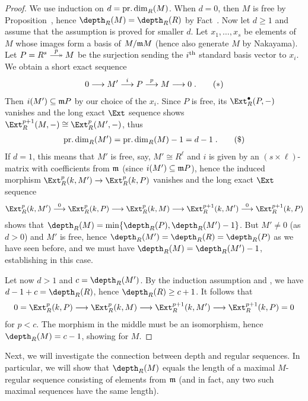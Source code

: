 \documentclass[a4paper,parskip=half,numbers=enddot, DIV=12]{scrreprt}
\begin{document}
\begin{proof}
	We use induction on $d=\operatorname{pr.dim}_R(M)$. When $d=0$, then $M$ is free by Proposition~, hence $\depth_R(M)=\depth_R(R)$ by Fact~. Now let $d\geq 1$ and assume that the assumption is proved for smaller $d$. Let $x_1,\ldots,x_s$ be elements of $M$ whose images form a basis of $M/\mathfrak{m} M$ (hence also generate $M$ by Nakayama). Let $P=R^s\epimorphism[p] M$ be the surjection sending the $i^{\text{th}}$ standard basis vector to $x_i$. We obtain a short exact sequence
	\begin{align}\lbl{eq:exactSeq1}
		0\morphism M'\morphism[i] P\morphism[p] M\morphism 0\;.\tag{$*$}
	\end{align}
	Then $i(M')\subseteq \mathfrak{m} P$ by our choice of the $x_i$. Since $P$ is free, its $\Ext_R^\bullet(P,-)$ vanishes and the long exact $\Ext$ sequence shows $\Ext_R^{p+1}(M,-)\cong \Ext_R^p(M',-)$, thus 
	\begin{align}\lbl{eq:depthInduction}
		\pdim_R(M')=\pdim_R(M)-1=d-1\;.\tag{\$}
	\end{align}
	If $d=1$, this means that $M'$ is free, say, $M'\cong R^\ell$ and $i$ is given by an $(s\times \ell)$-matrix with coefficients from $\mathfrak{m}$ (since $i(M')\subseteq \mathfrak{m} P$), hence the induced morphism $\Ext_R^p(k,M')\morphism\Ext_R^p(k,P)$ vanishes and the long exact $\Ext$ sequence
	\begin{align*}
		\Ext_R^p(k,M')\morphism[0]\Ext_R^p(k,P)\morphism\Ext_R^p(k,M)\morphism\Ext_R^{p+1}(k,M')\morphism[0]\Ext_R^{p+1}(k,P)
	\end{align*}
	shows that $\depth_R(M)=\min\{\depth_R(P),\depth_R(M')-1\}$. But $M'\neq 0$ (as $d>0$) and $M'$ is free, hence $\depth_R(M')=\depth_R(R)=\depth_R(P)$ as we have seen before, and we must have $\depth_R(M)=\depth_R(M')-1$, establishing  in this case.
	
	Let now $d>1$ and $c=\depth_R(M')$. By the induction assumption and , we have $d-1+c=\depth_R(R)$, hence $\depth_R(R)\geq c+1$. It follows that
	\begin{align*}
		0=\Ext_R^p(k,P)\morphism\Ext_R^p(k,M)\morphism\Ext_R^{p+1}(k,M')\morphism\Ext_R^{p+1}(k,P)=0
	\end{align*}
	for $p<c$. The morphism in the middle must be an isomorphism, hence $\depth_R(M)=c-1$, showing  for $M$.
\end{proof}
Next, we will investigate the connection between depth and regular sequences. In particular, we will show that $\depth_R(M)$ equals the length of a maximal $M$-regular sequence consisting of elements from $\mathfrak{m}$ (and in fact, any two such maximal sequences have the same length).
\end{document}
